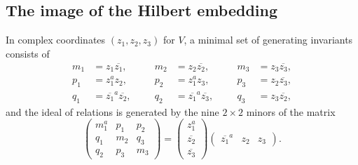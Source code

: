 \documentclass[twoside]{amsart}
\theoremstyle{definition}
\theoremstyle{remark}
\numberwithin{equation}{section}
\begin{document}

\subsection{The image of the Hilbert embedding}
\label{subsec:S1-1aa_ImageHilb}

In complex coordinates $(z_1, z_2, z_3)$ for $V$, a minimal set of generating invariants consists of
\begin{equation}
\label{eq:S1-1aa_CInvars}
\begin{aligned}
    m_1 &=      z_1 \overline{z_1},
    \qquad&
    m_2 &=      z_2 \overline{z_2},
    \qquad&
    m_3 &=      z_3 \overline{z_3},
    \\
    p_1 &=      z_1^a z_2,
    &
    p_2 &=      z_1^a z_3,
    &
    p_3 &=      z_2 \overline{z_3},
    \\
    q_1 &=      \overline{z_1}^a \overline{z_2},
    &
    q_2 &=      \overline{z_1}^a \overline{z_3},
    &
    q_3 &=      z_3 \overline{z_2},
\end{aligned}
\end{equation}
and the ideal of relations is generated by the nine $2\times 2$ minors of the matrix
\begin{equation}
\label{eq:S1-1aa_CRelat}
    \begin{pmatrix}
        m_1^a   &   p_1 &   p_2
        \\
        q_1     &   m_2 &   q_3
        \\
        q_2     &   p_3 &   m_3
    \end{pmatrix}
    =
    \begin{pmatrix}
        z_1^a
        \\
        \overline{z_2}
        \\
        \overline{z_3}
    \end{pmatrix}
    \begin{pmatrix}
        \overline{z_1}^a
        &
        z_2
        &
        z_3
    \end{pmatrix}.
\end{equation}
\end{document}
